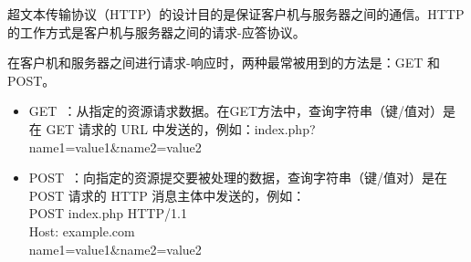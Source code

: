 超文本传输协议（HTTP）的设计目的是保证客户机与服务器之间的通信。HTTP 的工作方式是客户机与服务器之间的请求-应答协议\cite{fielding1999rfc}。

在客户机和服务器之间进行请求-响应时，两种最常被用到的方法是：GET 和 POST。
\begin{itemize}
\item GET~：从指定的资源请求数据。在GET方法中，查询字符串（键/值对）是在 GET 请求的 URL 中发送的，例如：index.php?name1=value1\&name2=value2~
\item POST~：向指定的资源提交要被处理的数据，查询字符串（键/值对）是在 POST 请求的 HTTP 消息主体中发送的，例如：\\
POST index.php HTTP/1.1\\
Host: example.com\\
name1=value1\&name2=value2\\
\end{itemize}